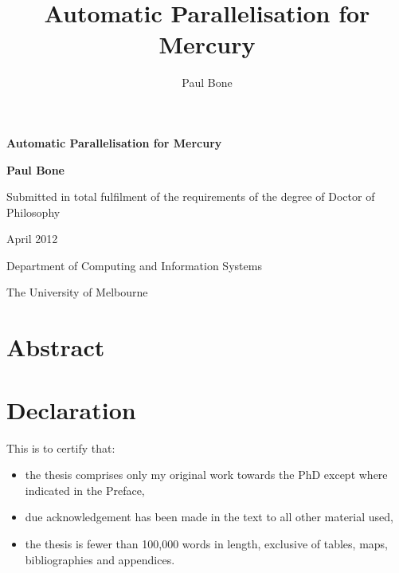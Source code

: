 \documentclass[a4paper,twoside]{report}
\title{Automatic Parallelisation for Mercury}
\author{Paul Bone}
\begin{document}
\begin{titlepage}
\begin{center}
\vspace*{3cm}
{\Huge \textbf{Automatic Parallelisation for Mercury}} \par
\vspace*{2cm}
{\huge \textbf{Paul Bone}} \par
\vspace*{4cm}
{\Large Submitted in total fulfilment of the requirements of the degree of
        Doctor of Philosophy} \par
\vspace*{1cm}
{\Large April 2012} \par
\vspace*{1cm}
{\Large Department of Computing and Information Systems} \par
{\Large The University of Melbourne} \par
\end{center}
\end{titlepage}

\chapter*{Abstract}


\chapter*{Declaration}


This is to certify that:

\begin{itemize}

    \item the thesis comprises only my original work towards the PhD except
          where indicated in the Preface,

    \item due acknowledgement has been made in the text to all other material
          used,

    \item the thesis is fewer than 100,000 words in length, exclusive of
          tables, maps, bibliographies and appendices.

\end{itemize}

\vspace{1em}
\end{document}
